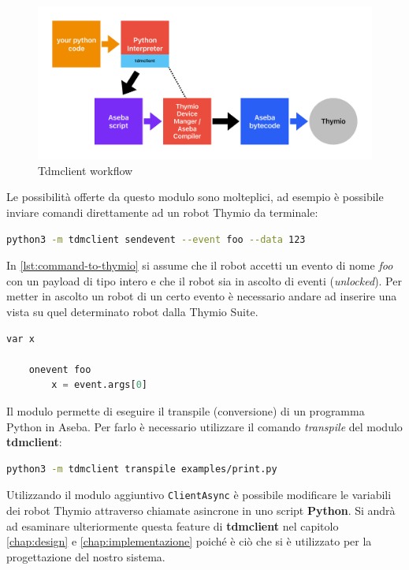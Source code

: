 \documentclass[12pt,a4paper,openright,twoside]{book}
\begin{document}
\begin{figure}
    \centering
    \includegraphics[width=.8\linewidth]{figures/TDM.pdf}
    \caption{Tdmclient workflow}
    \label{fig:tdmclient}
\end{figure}

Le possibilità offerte da questo modulo sono molteplici, ad esempio è possibile inviare comandi direttamente ad un robot Thymio da terminale:

\begin{lstlisting}[language=Bash, label={lst:command-to-thymio}, caption={Esempio di invio di comando (foo) ad un robot Thymio}]
    python3 -m tdmclient sendevent --event foo --data 123
\end{lstlisting}

In \cref{lst:command-to-thymio} si assume che il robot accetti un evento di nome \textit{foo} con un payload di tipo intero e che il robot sia in ascolto di eventi (\textit{unlocked}). Per metter in ascolto un robot di un certo evento è necessario andare ad inserire una vista su quel determinato robot dalla Thymio Suite.

\begin{lstlisting}[language=Python, label={lst:thymio-catch-event}, caption={Esempio di programma interno a Thymio per la ricezione di eventi (foo)}]
    var x

    onevent foo
        x = event.args[0]
\end{lstlisting}

Il modulo permette di eseguire il transpile (conversione) di un programma Python in Aseba. Per farlo è necessario utilizzare il comando \textit{transpile} del modulo \textbf{tdmclient}:

\begin{lstlisting}[language=Bash, label={lst:transpile-python-to-aseba}, caption={Esempio di transpile di un programma Python (print.py) in Aseba}]
    python3 -m tdmclient transpile examples/print.py
\end{lstlisting}

Utilizzando il modulo aggiuntivo \verb|ClientAsync| è possibile modificare le variabili dei robot Thymio attraverso chiamate asincrone in uno script \textbf{Python}.
Si andrà ad esaminare ulteriormente questa feature di \textbf{tdmclient} nel capitolo \cref{chap:design} e \cref{chap:implementazione} poiché è ciò che si è utilizzato per la progettazione del nostro sistema.
\end{document}
